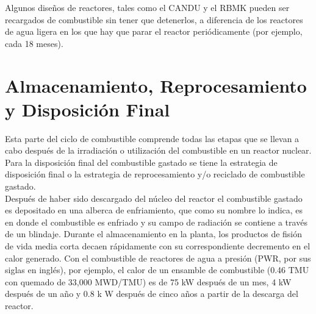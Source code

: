 \documentclass[]{article}
\begin{document}
Algunos diseños de reactores, tales como el CANDU y el RBMK pueden ser recargados de combustible sin tener que detenerlos, a diferencia de los reactores de agua ligera en los que hay que parar el reactor periódicamente (por ejemplo, cada 18 meses).\\


\section{Almacenamiento, Reprocesamiento y Disposición Final}

Esta parte del ciclo de combustible comprende todas las etapas que se llevan a cabo después de la irradiación o utilización del combustible en un reactor nuclear.\\

Para la disposición final del combustible gastado se tiene la estrategia de disposición final o la estrategia de reprocesamiento y/o reciclado de combustible gastado.\\

Después de haber sido descargado del núcleo del reactor el combustible gastado es depositado en una alberca de enfriamiento, que como su nombre lo indica, es en donde el combustible es enfriado y su campo de radiación se contiene a través de un blindaje. Durante el almacenamiento en la planta, los productos de fisión de vida media corta decaen rápidamente con su correspondiente decremento en el calor generado. Con el combustible de reactores de agua a presión (PWR, por sus siglas en inglés), por ejemplo, el calor de un ensamble de combustible (0.46 TMU con quemado de 33,000 MWD/TMU)  es de 75 kW después de un mes, 4 kW después de un año y 0.8 k W después de cinco años a partir de la descarga del reactor.\\
\end{document}
